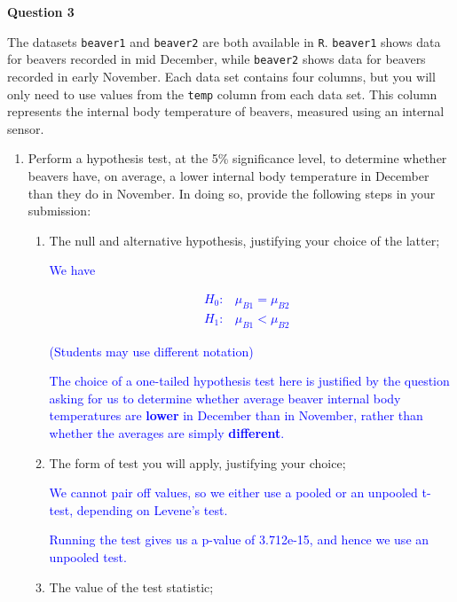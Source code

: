 \documentclass[11pt,a4paper]{article}
\begin{document}
\textbf{Question 3}
\vspace{0.2cm}

The datasets \texttt{beaver1} and \texttt{beaver2} are both available in \texttt{R}.  \texttt{beaver1} shows data for beavers recorded in mid December, while \texttt{beaver2} shows data for beavers recorded in early November. Each data set contains four columns, but you will only need to use values from the \texttt{temp} column from each data set. This column represents the internal body temperature of beavers, measured using an internal sensor.

\begin{enumerate}

\item Perform a hypothesis test, at the 5\% significance level, to determine whether beavers have, on average, a lower internal body temperature in December than they do in November. In doing so, provide the following steps in your submission:

\begin{enumerate}
\item The null and alternative hypothesis, justifying your choice of the latter;

\textcolor{blue}{We have}

\textcolor{blue}{
\begin{eqnarray*}
H_0:&\mu_{B1}=\mu_{B2}&\\
H_1:&\mu_{B1}<\mu_{B2}&
\end{eqnarray*}
}

\textcolor{blue}{(Students may use different notation)}

\textcolor{blue}{The choice of a one-tailed hypothesis test here is justified by the question asking for us to determine whether average beaver internal body temperatures are \textbf{lower} in December than in November, rather than whether the averages are simply \textbf{different}.}

 

\item The form of test you will apply, justifying your choice;


\textcolor{blue}{We cannot pair off values, so we either use a pooled or an unpooled t-test, depending on Levene's test.}

\textcolor{blue}{Running the test gives us a p-value of 3.712e-15, and hence we use an unpooled test.}
 

\item The value of the test statistic;


\end{enumerate}
\end{enumerate}
\end{document}
